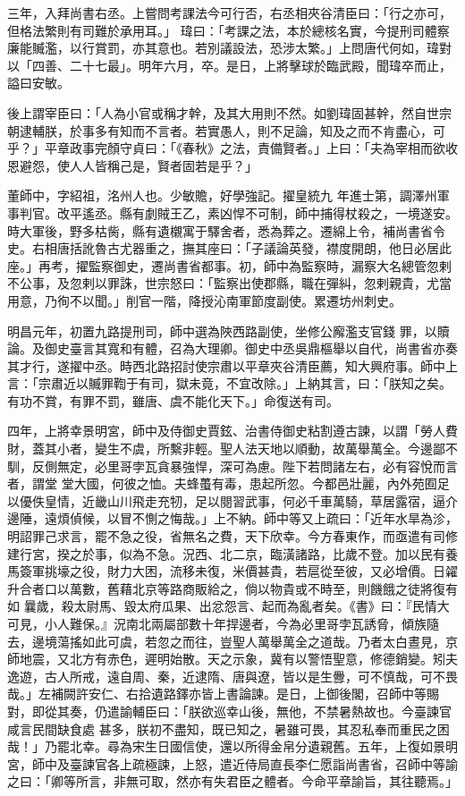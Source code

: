 \begin{pinyinscope}
 三年，入拜尚書右丞。上嘗問考課法今可行否，右丞相夾谷清臣曰：「行之亦可，但格法繁則有司難於承用耳。」
 瑋曰：「考課之法，本於總核名實，今提刑司體察廉能贓濫，以行賞罰，亦其意也。若別議設法，恐涉太繁。」上問唐代何如，瑋對以「四善、二十七最」。明年六月，卒。是日，上將擊球於臨武殿，聞瑋卒而止，謚曰安敏。



 後上謂宰臣曰：「人為小官或稱才幹，及其大用則不然。如劉瑋固甚幹，然自世宗朝逮輔朕，於事多有知而不言者。若實愚人，則不足論，知及之而不肯盡心，可乎？」平章政事完顏守貞曰：「《春秋》之法，責備賢者。」上曰：「夫為宰相而欲收恩避怨，使人人皆稱己是，賢者固若是乎？」



 董師中，字紹祖，洺州人也。少敏贍，好學強記。擢皇統九
 年進士第，調澤州軍事判官。改平遙丞。縣有劇賊王乙，素凶悍不可制，師中捕得杖殺之，一境遂安。時大軍後，野多枯胔，縣有遺櫬寓于驛舍者，悉為葬之。遷綿上令，補尚書省令史。右相唐括訛魯古尤器重之，撫其座曰：「子議論英發，襟度開朗，他日必居此座。」再考，擢監察御史，遷尚書省都事。初，師中為監察時，漏察大名總管忽剌不公事，及忽剌以罪誅，世宗怒曰：「監察出使郡縣，職在彈糾，忽剌親貴，尤當用意，乃徇不以聞。」削官一階，降授沁南軍節度副使。累遷坊州刺史。



 明昌元年，初置九路提刑司，師中選為陜西路副使，坐修公廨濫支官錢
 罪，以贖論。及御史臺言其寬和有體，召為大理卿。御史中丞吳鼎樞舉以自代，尚書省亦奏其才行，遂擢中丞。時西北路招討使宗肅以平章夾谷清臣薦，知大興府事。師中上言：「宗肅近以贓罪鞫于有司，獄未竟，不宜改除。」上納其言，曰：「朕知之矣。有功不賞，有罪不罰，雖唐、虞不能化天下。」命復送有司。



 四年，上將幸景明宮，師中及侍御史賈鉉、治書侍御史粘割遵古諫，以謂「勞人費財，蓋其小者，變生不虞，所繫非輕。聖人法天地以順動，故萬舉萬全。今邊鄙不馴，反側無定，必里哥孛瓦貪暴強悍，深可為慮。陛下若問諸左右，必有容悅而言者，謂堂
 堂大國，何彼之恤。夫蜂蠆有毒，患起所忽。今都邑壯麗，內外苑囿足以優佚皇情，近畿山川飛走充牣，足以閱習武事，何必千車萬騎，草居露宿，逼介邊陲，遠煩偵候，以冒不惻之悔哉。」上不納。師中等又上疏曰：「近年水旱為沴，明詔罪己求言，罷不急之役，省無名之費，天下欣幸。今方春東作，而亟遣有司修建行宮，揆之於事，似為不急。況西、北二京，臨潢諸路，比歲不登。加以民有養馬簽軍挑壕之役，財力大困，流移未復，米價甚貴，若扈從至彼，又必增價。日糴升合者口以萬數，舊藉北京等路商販給之，倘以物貴或不時至，則饑餓之徒將復有如
 曩歲，殺太尉馬、毀太府瓜果、出忿怨言、起而為亂者矣。《書》曰：『民情大可見，小人難保。』況南北兩屬部數十年捍邊者，今為必里哥孛瓦誘脅，傾族隨去，邊境蕩搖如此可虞，若忽之而往，豈聖人萬舉萬全之道哉。乃者太白晝見，京師地震，又北方有赤色，遲明始散。天之示象，冀有以警悟聖意，修德銷變。矧夫逸遊，古人所戒，遠自周、秦，近逮隋、唐與遼，皆以是生釁，可不慎哉，可不畏哉。」左補闕許安仁、右拾遺路鐸亦皆上書論諫。是日，上御後閣，召師中等賜對，即從其奏，仍遣諭輔臣曰：「朕欲巡幸山後，無他，不禁暑熱故也。今臺諫官咸言民間缺食處
 甚多，朕初不盡知，既已知之，暑雖可畏，其忍私奉而重民之困哉！」乃罷北幸。尋為宋生日國信使，還以所得金帛分遺親舊。五年，上復如景明宮，師中及臺諫官各上疏極諫，上怒，遣近侍局直長李仁愿詣尚書省，召師中等諭之曰：「卿等所言，非無可取，然亦有失君臣之體者。今命平章諭旨，其往聽焉。」




\end{pinyinscope}
